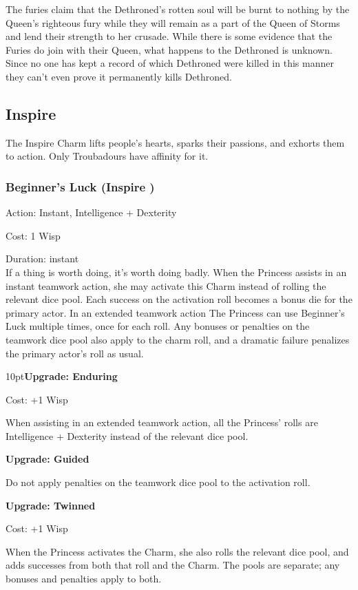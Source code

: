 The furies claim that the Dethroned's rotten soul will be burnt to nothing by the Queen's righteous fury while they will remain as a part of the Queen of Storms and lend their strength to her crusade. While there is some evidence that the Furies do join with their Queen, what happens to the Dethroned is unknown. Since no one has kept a record of which Dethroned were killed in this manner they can't even prove it permanently kills Dethroned. 

\subsection*{Inspire}
The Inspire Charm lifts people's hearts, sparks their passions, and exhorts them to action. Only Troubadours have affinity for it.

\subsubsection*{Beginner's Luck (Inspire \textbullet)}

\noindent Action: Instant, Intelligence + Dexterity

\noindent Cost: 1 Wisp

\noindent Duration: instant\\

\noindent  If a thing is worth doing, it's worth doing badly. When the Princess assists in an instant teamwork action, she may activate this Charm instead of rolling the relevant dice pool. Each success on the activation roll becomes a bonus die for the primary actor. In an extended teamwork action The Princess can use Beginner's Luck multiple times, once for each roll. Any bonuses or penalties on the teamwork dice pool also apply to the charm roll, and a dramatic failure penalizes the primary actor's roll as usual.

\begin{myindentpar}{10pt}\textbf{Upgrade: Enduring}

\noindent Cost: +1 Wisp

When assisting in an extended teamwork action, all the Princess' rolls are Intelligence + Dexterity instead of the relevant dice pool.

\textbf{Upgrade: Guided}

Do not apply penalties on the teamwork dice pool to the activation roll.

\textbf{Upgrade: Twinned}

\noindent Cost: +1 Wisp

When the Princess activates the Charm, she also rolls the relevant dice pool, and adds successes from both that roll and the Charm. The pools are separate; any bonuses and penalties apply to both.\end{myindentpar}

